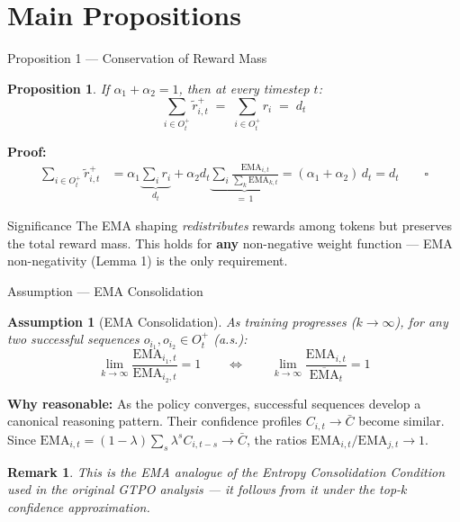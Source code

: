 \documentclass[aspectratio=169, 11pt]{beamer}
\newtheorem{proposition}{Proposition}
\newtheorem{assumption}{Assumption}
\newtheorem{remark}{Remark}
\newcommand{\EMA}{\mathrm{EMA}}
\newcommand{\GEMA}{\overline{\mathrm{EMA}}}
\begin{document}
\section{Main Propositions}

\begin{frame}{Proposition 1 — Conservation of Reward Mass}

\begin{proposition}
If $\alpha_1 + \alpha_2 = 1$, then at every timestep $t$:
\[
\sum_{i \in O^+_t} \tilde{r}^+_{i,t} \;=\; \sum_{i \in O^+_t} r_i \;=\; d_t
\]
\end{proposition}

\textbf{Proof:}
\begin{align*}
\sum_{i \in O^+_t} \tilde{r}^+_{i,t}
&= \alpha_1 \underbrace{\sum_{i} r_i}_{d_t}
 + \alpha_2 d_t \underbrace{\sum_{i} \frac{\EMA_{i,t}}{\sum_k \EMA_{k,t}}}_{=\,1}
= (\alpha_1 + \alpha_2)\, d_t = d_t \qquad\square
\end{align*}

\medskip
\begin{block}{Significance}
The EMA shaping \emph{redistributes} rewards among tokens but preserves the
total reward mass. This holds for \textbf{any} non-negative weight function —
EMA non-negativity (Lemma 1) is the only requirement.
\end{block}

\end{frame}

\begin{frame}{Assumption — EMA Consolidation}

\begin{assumption}[EMA Consolidation]
As training progresses ($k \to \infty$), for any two successful sequences
$o_{i_1}, o_{i_2} \in O^+_t$ (a.s.):
\[
\lim_{k\to\infty} \frac{\EMA_{i_1,t}}{\EMA_{i_2,t}} = 1
\qquad\Longleftrightarrow\qquad
\lim_{k\to\infty} \frac{\EMA_{i,t}}{\GEMA_t} = 1
\]
\end{assumption}

\medskip
\textbf{Why reasonable:} As the policy converges, successful sequences develop
a canonical reasoning pattern. Their confidence profiles $C_{i,t} \to \bar{C}$
become similar. Since
$\EMA_{i,t} = (1-\lambda)\sum_s \lambda^s C_{i,t-s} \to \bar{C}$,
the ratios $\EMA_{i,t}/\EMA_{j,t} \to 1$.

\medskip
\begin{remark}
This is the EMA analogue of the \emph{Entropy Consolidation Condition} used in
the original GTPO analysis — it follows from it under the top-$k$ confidence
approximation.
\end{remark}

\end{frame}
\end{document}
